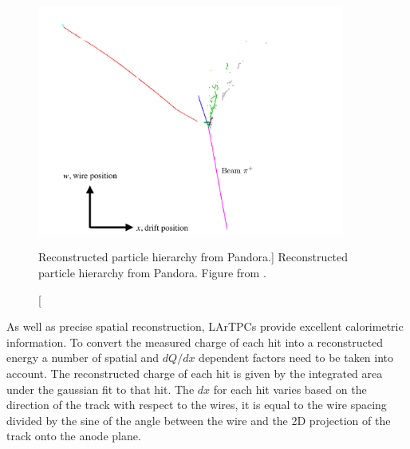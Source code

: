 \begin{figure}

	\centering

	\includegraphics[width=0.9\textwidth]{figures/pandoraEvent.pdf}

	\caption
	[Reconstructed particle hierarchy from Pandora.]
	{Reconstructed particle hierarchy from Pandora. Figure from
	\cite{protoduneperf}.}

	\label{fig:pandora_pfp}

\end{figure}

As well as precise spatial reconstruction, LArTPCs provide excellent
calorimetric information. To convert the measured charge of each hit into a
reconstructed energy a number of spatial and $dQ/dx$ dependent factors need to
be taken into account. The reconstructed charge of each hit is given by the
integrated area under the gaussian fit to that hit. The $dx$ for each hit varies
based on the direction of the track with respect to the wires, it is equal to
the wire spacing divided by the sine of the angle between the wire and the 2D
projection of the track onto the anode plane.

